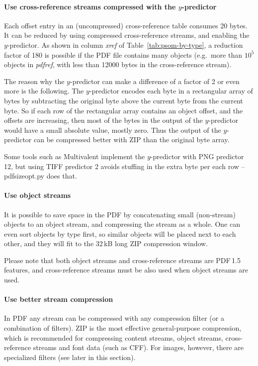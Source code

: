 \documentclass{ltugproc}
\def\cmd{\textsf}
\begin{document}
\paragraph{Use cross-reference streams compressed with the $y$-predictor}

Each offset entry in an (uncompressed) cross-reference table consumes 20
bytes. It can be reduced by using compressed cross-reference streams, and
enabling the $y$-predictor. As shown in column \emph{xref} of
Table~\ref{tab:psom-by-type}, a reduction factor of 180 is possible if the
PDF file contains many objects (e.g.\ more than $10^5$ objects in
\emph{pdfref}, with less than 12000 bytes in the cross-reference stream).

The reason why the $y$-predictor can make a difference of a factor of 2 or
even more is the following.
The $y$-predictor encodes each byte in a rectangular array of bytes by
subtracting the original byte above the current byte from the current byte.
So if each row of the rectangular array contains an object offset, and the
offsets are increasing, then most of the bytes in the output of the
$y$-predictor would have a small absolute value, mostly zero. Thus the
output of the $y$-predictor can be compressed better with ZIP than
the original byte array.

Some tools such as Multivalent implement the $y$-predictor with PNG
predictor 12, but using TIFF predictor 2 avoids stuffing in the extra byte
per each row -- \cmd{pdfsizeopt.py} does that.

\paragraph{Use object streams}

It is possible to save space in the PDF by concatenating small (non-stream)
objects to an object stream, and compressing the stream as a whole. One can
even sort objects by type first, so similar objects will be placed next to
each other, and they will fit to the 32\,kB long ZIP compression window.

Please note that both object streams and cross-reference streams are
PDF\,1.5 features, and cross-reference streams must be also used when object
streams are used.

\paragraph{Use better stream compression}

In PDF any stream can be compressed with any compression filter (or a
combination of filters). ZIP is the most effective general-purpose
compression, which is recommended for compressing content streams, object
streams, cross-reference streams and font data (such as CFF).
For images, however, there are specialized filters (see later in this
section).
\end{document}
